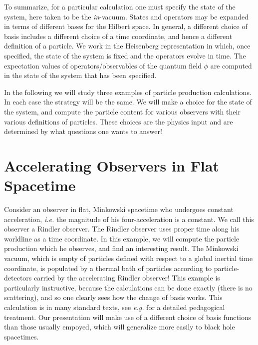 \documentclass[12pt]{article}
\begin{document}
To summarize, for a particular calculation one must specify the state of
the system, here
taken to be the {\it in}-vacuum.
States and operators may be expanded in terms of different bases for the Hilbert
space. In general, a different choice of basis includes a different
choice of a time coordinate, and hence a different definition of a particle.
We work in the Heisenberg representation in which,
once specified, the state of the system is fixed and the operators evolve
in time. The
expectation values of operators/observables of the quantum field $\phi$ are
computed in the
state of the system that has been specified.

In the following we will study three examples of particle production
calculations. In each case the
strategy will be the same. We will make a choice for the state of the
system, and compute the
particle content for various observers with their various definitions of
particles.
These choices are the physics input and are determined by what questions
one wants to answer!

\section{Accelerating Observers in Flat Spacetime}

Consider an  observer in flat, Minkowski spacetime who undergoes
constant acceleration, {\it i.e.} the magnitude of his four-acceleration is
a constant.
We call this observer a Rindler observer.
The Rindler observer uses proper time along his worldline as a time coordinate.
In this example, we will compute the particle production which he observes,
and find an interesting result. The Minkowski vacuum, which is empty of
particles defined with respect to a global inertial time coordinate,
is populated by a thermal bath of particles according to particle-detectors
carried by the accelerating Rindler observer! This example is particularly instructive,
because the calculations can be done exactly (there is no scattering), and
so one clearly sees how the change of basis works.  This calculation
is in many standard texts, see {\it e.g.} \cite{bad} for a detailed pedagogical
treatment.  Our presentation will make use of a different
choice of basis functions than those usually empoyed, which will generalize more
easily to black hole spacetimes.
\end{document}
